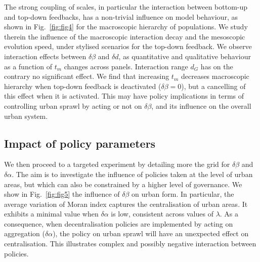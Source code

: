 \documentclass[referee,lineno,pdflatex,sn-apa]{sn-jnl}
\begin{document}
The strong coupling of scales, in particular the interaction between bottom-up and top-down feedbacks, has a non-trivial influence on model behaviour, as shown in Fig.~\ref{fig:fig4} for the macroscopic hierarchy of populations. We study therein the influence of the macroscopic interaction decay and the mesoscopic evolution speed, under stylised scenarios for the top-down feedback. We observe interaction effects between $\delta \beta$ and $\delta d$, as quantitative and qualitative behaviour as a function of $t_m$ changes across panels. Interaction range $d_G$ has on the contrary no significant effect. We find that increasing $t_m$ decreases macroscopic hierarchy when top-down feedback is deactivated ($\delta \beta=0$), but a cancelling of this effect when it is activated. This may have policy implications in terms of controlling urban sprawl by acting or not on $\delta \beta$, and its influence on the overall urban system.





\subsection{Impact of policy parameters}




We then proceed to a targeted experiment by detailing more the grid for $\delta \beta$ and $\delta \alpha$. The aim is to investigate the influence of policies taken at the level of urban areas, but which can also be constrained by a higher level of governance. We show in Fig.~\ref{fig:fig5} the influence of $\delta \beta$ on urban form. In particular, the average variation of Moran index captures the centralisation of urban areas. It exhibits a minimal value when $\delta \alpha$ is low, consistent across values of $\lambda$. As a consequence, when decentralisation policies are implemented by acting on aggregation ($\delta \alpha$), the policy on urban sprawl will have an unexpected effect on centralisation. This illustrates complex and possibly negative interaction between policies.

\end{document}

